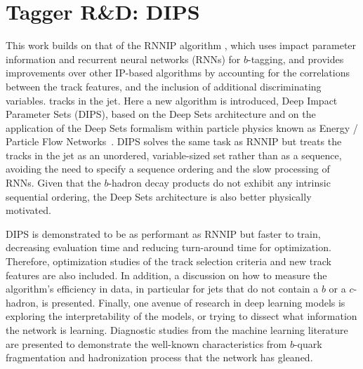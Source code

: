 \section{Tagger R\&D: DIPS}


This work builds on that of the RNNIP algorithm \cite{ATL-PHYS-PUB-2017-003}, which uses impact parameter information and recurrent neural networks (RNNs) for $b$-tagging, and provides improvements over other IP-based algorithms by accounting for the correlations between the track features, and the inclusion of additional discriminating variables. %
tracks in the jet.
Here a new algorithm is introduced, Deep Impact Parameter Sets (DIPS), based on the Deep Sets architecture \cite{DBLP:journals/corr/ZaheerKRPSS17} and on the application of the Deep Sets formalism within particle physics known as Energy / Particle Flow Networks~\cite{Komiske_2019}.
DIPS solves the same task as RNNIP but treats the tracks in the jet as an unordered, variable-sized set rather than as a sequence, avoiding the need to specify a sequence ordering and the slow processing of RNNs. 
Given that the $b$-hadron decay products do not exhibit any intrinsic sequential ordering, the Deep Sets architecture is also better physically motivated.

DIPS is demonstrated to be as performant as RNNIP but faster to train, decreasing evaluation time and reducing turn-around time for optimization. Therefore, optimization studies of the track selection criteria and new track features are also included.
In addition, a discussion on how to measure the algorithm's efficiency in data, in particular for jets that do not contain a $b$ or a $c$-hadron, is presented. %
Finally, one avenue of research in deep learning models is exploring the interpretability of the models, or trying to dissect what information the network is learning. 
Diagnostic studies from the machine learning literature are presented to demonstrate the well-known characteristics from $b$-quark fragmentation and hadronization process that the network has gleaned.






